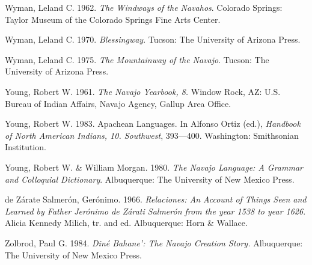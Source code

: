 Wyman, Leland C. 1962.  \textit{The Windways of the Navahos}.  Colorado Springs:  Taylor Museum of the Colorado Springs Fine Arts Center.

Wyman, Leland C. 1970.  \textit{Blessingway}.  Tucson:  The University of Arizona Press.

Wyman, Leland C. 1975.  \textit{The Mountainway of the Navajo}.  Tucson:  The University of Arizona Press.



Young, Robert W. 1961.  \textit{The Navajo Yearbook, 8.}  Window Rock, AZ:  U.S. Bureau of Indian Affairs, Navajo Agency, Gallup Area Office.

Young, Robert W. 1983.  Apachean Languages.  In Alfonso Ortiz (ed.), \textit{Handbook of North American Indians, 10.  Southwest},  393---400.  Washington:  Smithsonian Institution.


Young, Robert W. \& William Morgan. 1980.  \textit{The Navajo Language: A Grammar and Colloquial Dictionary}.  Albuquerque:  The University of New Mexico Press.

de Zárate Salmerón, Gerónimo. 1966. \textit{Relaciones: An Account of Things Seen and Learned by Father Jerónimo de Zárati Salmerón from the year 1538 to year 1626}.  Alicia Kennedy Milich, tr. and ed.  Albuquerque: Horn \& Wallace.

Zolbrod, Paul G. 1984.  \textit{Diné Bahane’: The Navajo Creation Story.}  Albuquerque:  The University of New Mexico Press.

